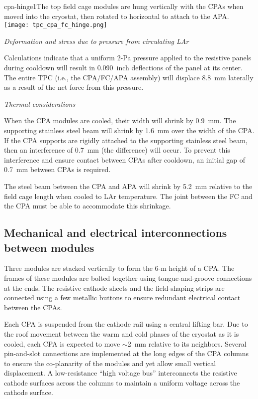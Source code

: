 \begin{cdrfigure}{cpa-hinge1}{The top field cage modules are hung vertically with the CPAs when moved into the cryostat, then rotated to horizontal to attach to the APA.} 
\texttt{[image: tpc\_cpa\_fc\_hinge.png]}
\end{cdrfigure}


{\it Deformation and stress due to pressure from circulating LAr}

Calculations indicate that a uniform 2-Pa pressure 
  applied to the resistive panels  during cooldown will result in 0.090~inch deflections of the panel at its center.  The entire TPC (i.e., the CPA/FC/APA assembly) will displace 8.8~mm laterally as a result of the net force from this pressure.  

{\it Thermal considerations}

When the CPA modules are cooled, their width will shrink by 0.9~mm.  The supporting stainless steel beam will shrink by 1.6~mm over the width of the CPA.  If the CPA supports are rigidly attached to the supporting stainless steel beam, then an interference of 0.7~mm (the difference) will occur.  To prevent this interference and ensure contact between CPAs after cooldown, an initial gap of 0.7~mm between CPAs is required.  

The steel beam between the CPA and APA will shrink by 5.2~mm relative to the field cage length when cooled to LAr temperature.  The joint between the FC and the CPA must be able to accommodate this shrinkage.



\subsection{Mechanical and electrical interconnections between modules}

Three modules are stacked vertically to form the 6-m height of a CPA. %
The frames of these modules are bolted together using tongue-and-groove connections at the ends. The resistive cathode sheets and the field-shaping strips are connected using a few metallic buttons to ensure redundant electrical contact between the CPAs. %

Each CPA is suspended from the cathode rail using a central lifting bar.  Due to the roof movement between the warm and cold phases of the cryostat as it is cooled, each CPA is expected to move $\sim$2~mm relative to its neighbors.  Several pin-and-slot connections are implemented at the long edges of the CPA columns to ensure the co-planarity of the modules and yet allow small vertical displacement.  A low-resistance
``high voltage bus''  interconnects the resistive cathode surfaces across the columns to maintain a uniform voltage across the cathode surface.

